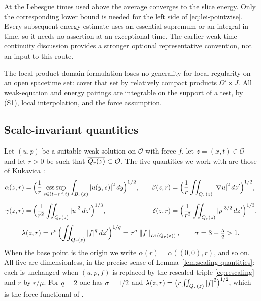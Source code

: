 \documentclass[11pt,reqno]{amsart}
\begin{document}
\begin{remark}\label{rem:lei-direction}
At the Lebesgue times used above the average converges to the slice
energy. Only the corresponding lower bound is needed for the left side
of \eqref{eq:lei-pointwise}. Every subsequent energy estimate uses an
essential supremum or an integral in time, so it needs no assertion at
an exceptional time. The earlier weak-time-continuity discussion provides
a stronger optional representative convention, not an input to this route.
\end{remark}

The local product-domain formulation loses no generality for local
regularity on an open spacetime set: cover that set by relatively compact
products $\Omega'\times J$. All weak-equation and energy pairings are
integrable on the support of a test, by (S1), local interpolation, and the
force assumption.

\subsection{Scale-invariant quantities}\label{ss:quantities}

Let $(u,p)$ be a suitable weak solution on $\mathcal{O}$ with force $f$, let
$z=(x,t)\in\mathcal{O}$ and let $r>0$ be such that
$\overline{Q_{r}(z)}\subset\mathcal{O}$. The five quantities we work with are those of
Kukavica \cite[\S2]{Kukavica2008}:
\begin{equation}\label{eq:alpha-beta}
\begin{aligned}
  \alpha(z,r)&=\Bigl(\frac1r\operatorname*{ess\,sup}_{s\in(t-r^{2},t)}
      \int_{B_{r}(x)}\left\lvert u(y,s) \right\rvert^{2}dy\Bigr)^{1/2},
  &\quad
  \beta(z,r)&=\Bigl(\frac1r\iint_{Q_{r}(z)}\left\lvert \nabla u \right\rvert^{2}dz'\Bigr)^{1/2},\\[4pt]
  \gamma(z,r)&=\Bigl(\frac1{r^{2}}\iint_{Q_{r}(z)}\left\lvert u \right\rvert^{3}dz'\Bigr)^{1/3},
  &\quad
  \delta(z,r)&=\Bigl(\frac1{r^{2}}\iint_{Q_{r}(z)}\left\lvert p \right\rvert^{3/2}dz'\Bigr)^{1/3},
\end{aligned}
\end{equation}
\begin{equation}\label{eq:lambda}
  \lambda(z,r)=r^{\sigma}\Bigl(\iint_{Q_{r}(z)}\left\lvert f \right\rvert^{q}dz'\Bigr)^{1/q}
              =r^{\sigma}\left\lVert f \right\rVert_{L^{q}(Q_{r}(z))},
  \qquad \sigma=3-\tfrac5q>1 .
\end{equation}
When the base point is the origin we write $\alpha(r)=\alpha((0,0),r)$, and so
on. All five are dimensionless, in the precise sense of
Lemma~\ref{lem:scaling-quantities}: each is unchanged when $(u,p,f)$ is replaced
by the rescaled triple \eqref{eq:rescaling} and $r$ by $r/\mu$. For $q=2$ one has
$\sigma=1/2$ and $\lambda(z,r)=\bigl(r\iint_{Q_{r}(z)}\left\lvert f \right\rvert^{2}\bigr)^{1/2}$,
which is the force functional of \cite[\S2]{Kukavica2008}.
\end{document}
